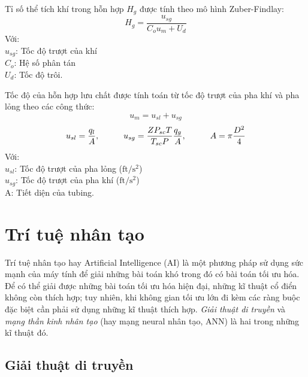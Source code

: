 \documentclass[12pt,a4paper]{report}
\begin{document}
Tỉ số thể tích khí trong hỗn hợp $H_g$ được tính theo mô hình Zuber-Findlay:
	\begin{equation}\label{eqn:gas-holdup}
		H_g = \dfrac{u_{sg}}{C_ou_m + U_d}
	\end{equation}
Với:\\
\hspace*{1cm}$u_{sg}$: Tốc độ trượt của khí\\
\hspace*{1cm}$C_o$: Hệ số phân tán\\
\hspace*{1cm}$U_d$: Tốc độ trôi.

Tốc độ của hỗn hợp lưu chất được tính toán từ tốc độ trượt của pha khí và pha lỏng theo các công thức:
	\begin{equation}\label{eqn:mixture-velocity}
		u_m = u_{sl} + u_{sg}
	\end{equation}
	\begin{equation}\label{eqn:usg-usl}
		u_{sl} = \dfrac{q_l}{A},\hspace*{1cm} u_{sg} = \dfrac{ZP_{sc}T}{T_{sc}P}\dfrac{q_g}{A},\hspace*{1cm} A = \pi\dfrac{D^2}{4}
	\end{equation}
Với:\\
\hspace*{1cm}$u_{sl}$: Tốc độ trượt của pha lỏng ($\text{ft}/\text{s}^2$)\\
\hspace*{1cm}$u_{sg}$: Tốc độ trượt của pha khí ($\text{ft}/\text{s}^2$)\\
\hspace*{1cm}A: Tiết diện của tubing.

\section{Trí tuệ nhân tạo}
Trí tuệ nhân tạo hay Artificial Intelligence (AI) là một phương pháp sử dụng sức mạnh của máy tính để giải những bài toán khó trong đó có bài toán tối ưu hóa. Để có thể giải được những bài toán tối ưu hóa hiện đại, những kĩ thuật cổ điển không còn thích hợp; tuy nhiên, khi không gian tối ưu lớn đi kèm các ràng buộc đặc biệt cần phải sử dụng những kĩ thuật thích hợp. \textit{Giải thuật di truyền} và \textit{mạng thần kinh nhân tạo} (hay mạng neural nhân tạo, ANN) là hai trong những kĩ thuật đó.\\

\subsection{Giải thuật di truyền}
\end{document}
